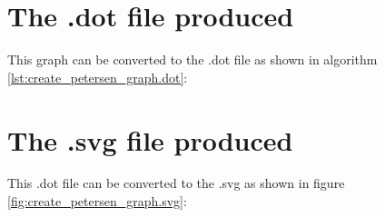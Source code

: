 \section{The .dot file produced}
\label{subsec:create_petersen_graph.dot}

This graph can be converted to the .dot file as shown in algorithm 
\ref{lst:create_petersen_graph.dot}:



\section{The .svg file produced}
\label{subsec:create_petersen.svg}

This .dot file can be converted to the .svg as shown in figure 
\ref{fig:create_petersen_graph.svg}:

